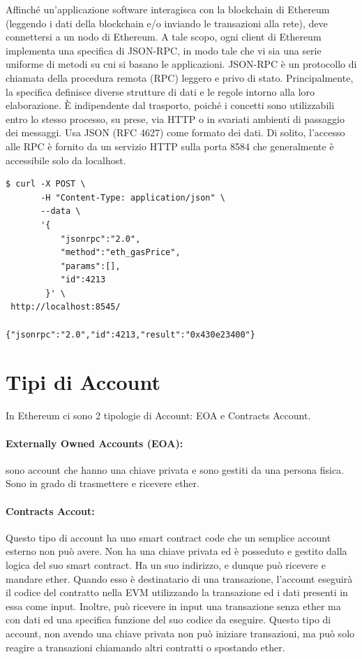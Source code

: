 Affinché un'applicazione software interagisca con la blockchain di Ethereum
(leggendo i dati della blockchain e/o inviando le transazioni alla rete), deve connettersi a
un nodo di Ethereum.
A tale scopo, ogni client di Ethereum implementa una specifica di JSON-RPC, in modo tale che vi
sia una serie uniforme di metodi su cui si basano le applicazioni.
JSON-RPC è un protocollo di chiamata della procedura remota (RPC) leggero e privo di stato.
Principalmente, la specifica definisce diverse strutture di dati e le regole intorno alla loro
elaborazione. È indipendente dal trasporto, poiché i concetti sono utilizzabili entro lo stesso
processo, su prese, via HTTP o in svariati ambienti di passaggio dei messaggi. Usa JSON (RFC 4627)
come formato dei dati.
Di solito, l'accesso alle RPC è fornito da un servizio HTTP sulla porta 8584 che
generalmente è accessibile solo da localhost.

\begin{lstlisting}[caption=Esempio di richiesta tramite jsonrpc]
$ curl -X POST \ 
       -H "Content-Type: application/json" \  
       --data \
       '{
           "jsonrpc":"2.0",
           "method":"eth_gasPrice",
           "params":[],
           "id":4213
        }' \
 http://localhost:8545/
 
{"jsonrpc":"2.0","id":4213,"result":"0x430e23400"}
\end{lstlisting}

\section{Tipi di Account}

In Ethereum ci sono 2 tipologie di Account: EOA e Contracts Account.

\paragraph{Externally Owned Accounts (EOA):}
sono account che hanno una chiave privata e sono gestiti da una persona fisica.
Sono in grado di trasmettere e ricevere ether.

\paragraph{Contracts Accout:}
Questo tipo di account ha uno smart contract code che un semplice account esterno non può avere.
Non ha una chiave privata ed è posseduto e gestito dalla logica del suo smart contract.
Ha un suo indirizzo, e dunque può ricevere e mandare ether.
Quando esso è destinatario di una transazione, l'account eseguirà il codice del contratto
nella EVM utilizzando la transazione ed i dati presenti in essa come input.
Inoltre, può ricevere in input una transazione senza ether ma con dati ed una specifica
funzione del suo codice da eseguire. Questo tipo di account, non avendo una chiave privata
non può iniziare transazioni, ma può solo reagire a transazioni chiamando altri contratti o
spostando ether.

